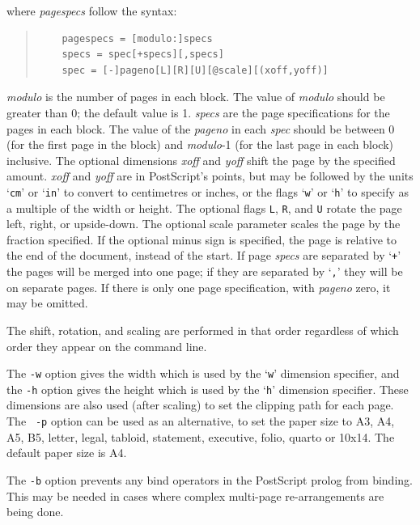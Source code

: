 \documentclass[twoside,11pt]{article}
\begin{document}
\begin{itemize}
where {\em pagespecs} follow the syntax: 

\small
\begin{quote}
\begin{verbatim}
    pagespecs = [modulo:]specs 
    specs = spec[+specs][,specs] 
    spec = [-]pageno[L][R][U][@scale][(xoff,yoff)] 
\end{verbatim}
\end{quote}
\normalsize

{\em modulo} is the number of pages in each block. The value of {\em
modulo} should be greater than 0; the default value is 1. {\em specs}
are the page specifications for the pages in each block. The value of
the {\em pageno} in each {\em spec} should be between 0 (for the first
page in the block) and {\em modulo}-1 (for the last page in each
block) inclusive. The optional dimensions {\em xoff} and {\em yoff}
shift the page by the specified amount. {\em xoff} and {\em yoff} are
in PostScript's points, but may be followed by the units `{\tt cm}' or
`{\tt in}' to convert to centimetres or inches, or the flags `{\tt w}'
or `{\tt h}' to specify as a multiple of the width or height. The
optional flags {\tt L}, {\tt R}, and {\tt U} rotate the page left,
right, or upside-down. The optional scale parameter scales the page by
the fraction specified. If the optional minus sign is specified, the
page is relative to the end of the document, instead of the start. If
page {\em specs} are separated by `{\tt +}' the pages will be merged
into one page; if they are separated by `{\tt ,}' they will be on
separate pages. If there is only one page specification, with {\em
pageno} zero, it may be omitted. 

The shift, rotation, and scaling are performed in that order
regardless of which order they appear on the command line. 

The {\tt -w} option gives the width which is used by the `{\tt w}'
dimension specifier, and the {\tt -h} option gives the height which is
used by the `{\tt h}' dimension specifier. These dimensions are also
used (after scaling) to set the clipping path for each page. The {\tt
-p} option can be used as an alternative, to set the paper size to A3,
A4, A5, B5, letter, legal, tabloid, statement, executive, folio,
quarto or 10x14. The default paper size is A4. 

The {\tt -b} option prevents any bind operators in the PostScript
prolog from binding. This may be needed in cases where complex
multi-page re-arrangements are being done. 


\end{itemize}
\end{document}
